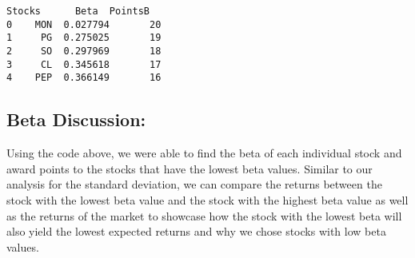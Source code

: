 \documentclass[11pt]{article}
\makeatletter
\newcommand{\boxspacing}{\kern\kvtcb@left@rule\kern\kvtcb@boxsep}
\newcommand{\prompt}[4]{
        {\ttfamily\llap{{\color{#2}[#3]:\hspace{3pt}#4}}\vspace{-\baselineskip}}
    }
\makeatother
\begin{document}
            \begin{tcolorbox}[breakable, size=fbox, boxrule=.5pt, pad at break*=1mm, opacityfill=0]
\prompt{Out}{outcolor}{24}{\boxspacing}
\begin{Verbatim}[commandchars=\\\{\}]
  Stocks      Beta  PointsB
0    MON  0.027794       20
1     PG  0.275025       19
2     SO  0.297969       18
3     CL  0.345618       17
4    PEP  0.366149       16
\end{Verbatim}
\end{tcolorbox}
        
    \hypertarget{beta-discussion}{%
\subsection{Beta Discussion:}\label{beta-discussion}}

Using the code above, we were able to find the beta of each individual
stock and award points to the stocks that have the lowest beta values.
Similar to our analysis for the standard deviation, we can compare the
returns between the stock with the lowest beta value and the stock with
the highest beta value as well as the returns of the market to showcase
how the stock with the lowest beta will also yield the lowest expected
returns and why we chose stocks with low beta values.
\end{document}
